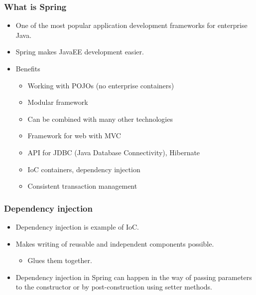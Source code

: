 \documentclass[10pt,xcolor=pdflatex, table]{beamer}
\begin{document}
\begin{frame}\frametitle{What is Spring}
	\begin{itemize}
		\item One of the most popular application development frameworks for enterprise Java.
		\item Spring makes JavaEE development easier.
		\item Benefits
          \begin{itemize}
        	\item Working with POJOs (no enterprise containers)
        	\item Modular framework
        	\item Can be combined with many other technologies
        	\item Framework for web with MVC
        	\item API for JDBC (Java Database Connectivity), Hibernate
        	\item IoC containers, dependency injection
        	\item Consistent transaction management
          \end{itemize}
	\end{itemize}
\end{frame}


\begin{frame}\frametitle{Dependency injection}
	\begin{itemize}
		\item Dependency injection is example of IoC.
		\item Makes writing of reusable and independent components possible.
          \begin{itemize}
        	\item Glues them together.
          \end{itemize}
		\item Dependency injection in Spring can happen in the way of passing parameters to the constructor or by post-construction using setter methods.
	\end{itemize}
\end{frame}
\end{document}
